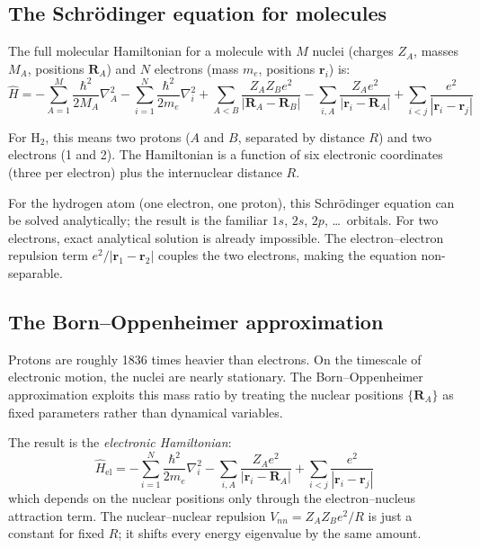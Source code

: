 \documentclass[aps,prb,preprint,longbibliography,nofootinbib]{revtex4-2}
\begin{document}
\subsection{The Schr\"odinger equation for molecules}

The full molecular Hamiltonian for a molecule with $M$ nuclei (charges
$Z_A$, masses $M_A$, positions $\mathbf{R}_A$) and $N$ electrons (mass
$m_e$, positions $\mathbf{r}_i$) is:
\begin{equation}
\hat{H} = -\sum_{A=1}^{M} \frac{\hbar^2}{2M_A} \nabla_A^2
           -\sum_{i=1}^{N} \frac{\hbar^2}{2m_e} \nabla_i^2
           + \sum_{A<B} \frac{Z_A Z_B e^2}{|\mathbf{R}_A - \mathbf{R}_B|}
           - \sum_{i,A} \frac{Z_A e^2}{|\mathbf{r}_i - \mathbf{R}_A|}
           + \sum_{i<j} \frac{e^2}{|\mathbf{r}_i - \mathbf{r}_j|}
\label{eq:full-hamiltonian}
\end{equation}

For H$_2$, this means two protons ($A$ and $B$, separated by distance
$R$) and two electrons (1 and 2).  The Hamiltonian is a function of six
electronic coordinates (three per electron) plus the internuclear
distance $R$.

For the hydrogen atom (one electron, one proton), this Schr\"odinger
equation can be solved analytically; the result is the familiar $1s$,
$2s$, $2p$, \ldots\ orbitals.  For two electrons, exact analytical
solution is already impossible.  The electron--electron repulsion term
$e^2/|\mathbf{r}_1 - \mathbf{r}_2|$ couples the two electrons, making
the equation non-separable.

\subsection{The Born--Oppenheimer approximation}

Protons are roughly 1836 times heavier than electrons.  On the timescale
of electronic motion, the nuclei are nearly stationary.  The
Born--Oppenheimer approximation exploits this mass ratio by treating the
nuclear positions $\{\mathbf{R}_A\}$ as fixed parameters rather than
dynamical variables.

The result is the \emph{electronic Hamiltonian}:
\begin{equation}
\hat{H}_\text{el} = -\sum_{i=1}^{N} \frac{\hbar^2}{2m_e} \nabla_i^2
                     - \sum_{i,A} \frac{Z_A e^2}{|\mathbf{r}_i - \mathbf{R}_A|}
                     + \sum_{i<j} \frac{e^2}{|\mathbf{r}_i - \mathbf{r}_j|}
\label{eq:electronic-hamiltonian}
\end{equation}
which depends on the nuclear positions only through the electron--nucleus
attraction term.  The nuclear--nuclear repulsion $V_{nn} = Z_A Z_B e^2 / R$
is just a constant for fixed $R$; it shifts every energy eigenvalue by
the same amount.
\end{document}
